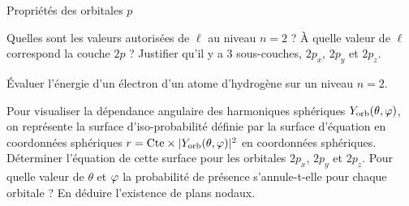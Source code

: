 \documentclass[12pt,fancy]{cours}
\begin{document}
\begin{exemple}{Propriétés des orbitales $p$}
  \begin{quest}
    \item	Quelles sont les valeurs autorisées de $\ell$ au niveau $n=2$ ? À quelle valeur de $\ell$ correspond la couche $2p$ ? Justifier qu'il y a $3$ sous-couches, $2p_x$, $2p_y$ et $2p_z$.
    \item Évaluer l'énergie d'un électron d'un atome d'hydrogène sur un niveau $n=2$. 
    \item Pour visualiser la dépendance angulaire des harmoniques sphériques $Y_{\rm orb}(\theta,\varphi)$, on représente la surface d'iso-probabilité définie par la surface d'équation en coordonnées sphériques  $r = \text{Cte} \times |Y_{\rm orb}(\theta,\varphi)|^2$ en coordonnées sphériques. Déterminer l'équation de cette surface pour les orbitales $2p_x$, $2p_y$ et $2p_z$. Pour quelle valeur de $\theta$ et $\varphi$ la probabilité de présence s'annule-t-elle pour chaque orbitale ? En déduire l'existence de plans nodaux.
  \end{quest}
  
  
  \end{exemple}
\end{document}
